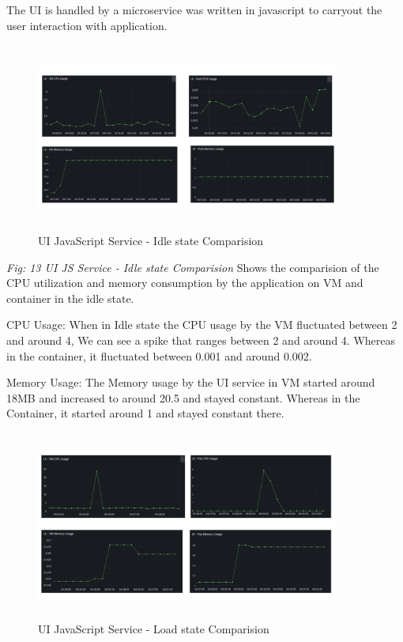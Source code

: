 The UI is handled by a microservice was written in javascript to carryout the user interaction with application. 

\begin{figure}[!h]
    \centering
    \includegraphics[width=10cm, height=6.2cm]{images/ui-cpu-idle-comp.png}
    \caption{UI JavaScript Service - Idle state Comparision}
\end{figure} 
\emph{Fig: 13 UI JS Service - Idle state Comparision} Shows the comparision of the CPU utilization and memory consumption by the application on VM and container in the idle state.

CPU Usage: When in Idle state the CPU usage by the VM fluctuated between 2 and around 4, We can see a spike that ranges between 2 and around 4. Whereas in the container, it fluctuated between 0.001 and around 0.002.

Memory Usage:  The Memory usage by the UI service in VM started around 18MB and increased to around 20.5 and stayed constant. Whereas in the Container, it started around 1 and stayed constant there.

\begin{figure}[!h]
    \centering
    \includegraphics[width=10cm, height=6.2cm]{images/ui-cpu-load-comp.png}
    \caption{UI JavaScript Service - Load state Comparision}
\end{figure}

